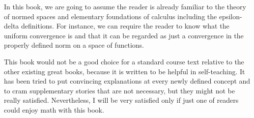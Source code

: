 In this book, we are going to assume the reader is already familiar to the theory of normed spaces and elementary foundations of calculus including the epsilon-delta definitions.
For instance, we can require the reader to know what the uniform convergence is and that it can be regarded as just a convergence in the properly defined norm on a space of functions.

This book would not be a good choice for a standard course text relative to the other existing great books, because it is written to be helpful in self-teaching.
It has been tried to put convincing explanations at every newly defined concept and to cram supplementary stories that are not necessary, but they might not be really satisfied.
Nevertheless, I will be very satisfied only if just one of readers could enjoy math with this book.
